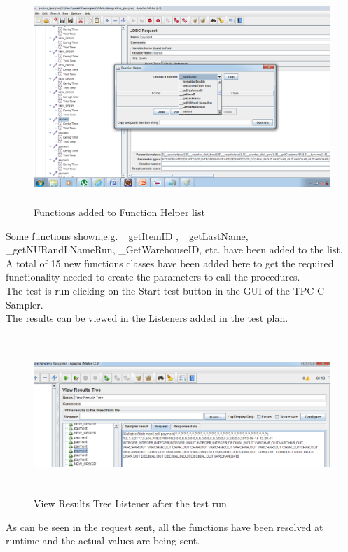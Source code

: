 \documentclass[12pt]{book}
\begin{document}
  \begin{figure}[H]
    \centering
    \includegraphics[width=15cm, height=8cm]{images/ntpcc_91}
    \caption{Functions added to Function Helper list\label{fig:fig75_JMeter}}
   \end{figure}
   
   Some functions shown,e.g. \_getItemID , \_getLastName, \_getNURandLNameRun,
   \_GetWarehouseID, etc. have been added to the list.\\
   A total of 15 new functions classes have been added here to get the required functionality needed to create the parameters to call the procedures.\\

   The test is run clicking on the Start test button in the GUI of the TPC-C Sampler.\\
   The results can be viewed in the Listeners added in the test plan.\\
    
  \begin{figure}[H]
    \centering
    \includegraphics[width=15cm, height=6cm]{images/ntpcc_92}
    \caption{View Results Tree Listener after the test run\label{fig:fig76_JMeter}}
   \end{figure}
   As can be seen in the request sent, all the functions have been resolved at runtime and the actual
   values are being sent.
\end{document}
